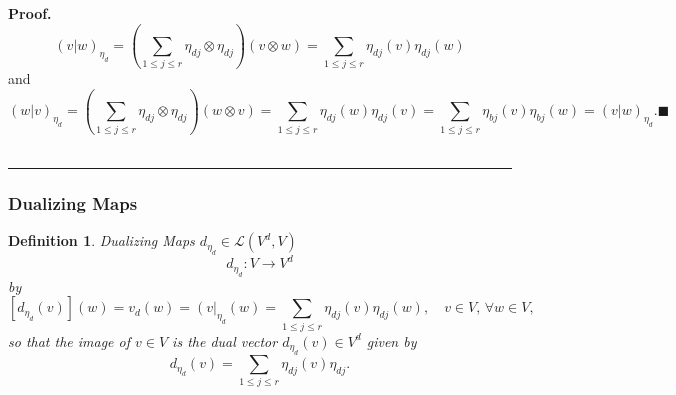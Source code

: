 \documentclass[aps,preprint]{revtex4}
\newtheorem{definition}[theorem]{Definition}
\newenvironment{proof}[1][Proof]{\noindent\textbf{#1.} }{\ \rule{0.5em}{0.5em}}
\begin{document}
\begin{proof}
\begin{equation}
\left( \left. v\right\vert w\right) _{\eta _{d}}=\left( \sum_{1\leq j\leq
r}\eta _{dj}\otimes \eta _{dj}\right) \left( v\otimes w\right) =\sum_{1\leq
j\leq r}\eta _{dj}\left( v\right) \eta _{dj}\left( w\right)
\end{equation}%
and 
\begin{equation}
\left( \left. w\right\vert v\right) _{\eta _{d}}=\left( \sum_{1\leq j\leq
r}\eta _{dj}\otimes \eta _{dj}\right) \left( w\otimes v\right) =\sum_{1\leq
j\leq r}\eta _{dj}\left( w\right) \eta _{dj}\left( v\right) =\sum_{1\leq
j\leq r}\eta _{bj}\left( v\right) \eta _{bj}\left( w\right) =\left( \left.
v\right\vert w\right) _{\eta _{d}}.\blacksquare
\end{equation}
\end{proof}

\subsubsection{Dualizing Maps \label{Dualizing Maps}}

\begin{definition}
\emph{Dualizing Maps} $d_{\eta _{d}}\in \mathcal{L}\left( V^{d},V\right) $ 
\begin{equation}
d_{\eta _{d}}:V\rightarrow V^{d}
\end{equation}%
by%
\begin{equation}
\left[ \overset{}{d_{\eta _{d}}\left( v\right) }\right] \left( w\right)
=v_{d}\left( w\right) =\left( v\right\vert _{\eta _{d}}\left( w\right)
=\sum_{1\leq j\leq r}\eta _{dj}\left( \overset{}{v}\right) \eta _{dj}\left(
w\right) ,\quad v\in V,\,\forall w\in V,
\end{equation}%
so that the image of $v\in V$ is the dual vector $d_{\eta _{d}}\left(
v\right) \in V^{d}$ given by 
\begin{equation}
d_{\eta _{d}}\left( v\right) =\sum_{1\leq j\leq r}\eta _{dj}\left( \overset{}%
{v}\right) \eta _{dj}.
\end{equation}
\end{definition}
\end{document}
